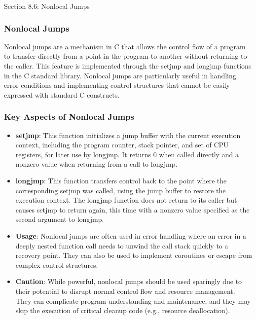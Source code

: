 \begin{notes}{Section 8.6: Nonlocal Jumps}
    \subsubsection*{Nonlocal Jumps}

    Nonlocal jumps are a mechanism in C that allows the control flow of a program to transfer directly from a point in the program to another without returning to the caller. This feature is implemented 
    through the setjmp and longjmp functions in the C standard library. Nonlocal jumps are particularly useful in handling error conditions and implementing control structures that cannot be easily 
    expressed with standard C constructs. \vspace*{1em}
    
    \subsubsection*{Key Aspects of Nonlocal Jumps}
    
    \begin{itemize}
        \item \textbf{setjmp}: This function initializes a jump buffer with the current execution context, including the program counter, stack pointer, and set of CPU registers, for later use by 
        longjmp. It returns 0 when called directly and a nonzero value when returning from a call to longjmp.
        \item \textbf{longjmp}: This function transfers control back to the point where the corresponding setjmp was called, using the jump buffer to restore the execution context. The longjmp 
        function does not return to its caller but causes setjmp to return again, this time with a nonzero value specified as the second argument to longjmp.
        \item \textbf{Usage}: Nonlocal jumps are often used in error handling where an error in a deeply nested function call needs to unwind the call stack quickly to a recovery point. They can also 
        be used to implement coroutines or escape from complex control structures.
        \item \textbf{Caution}: While powerful, nonlocal jumps should be used sparingly due to their potential to disrupt normal control flow and resource management. They can complicate program 
        understanding and maintenance, and they may skip the execution of critical cleanup code (e.g., resource deallocation).
    \end{itemize}
    

\end{notes}
